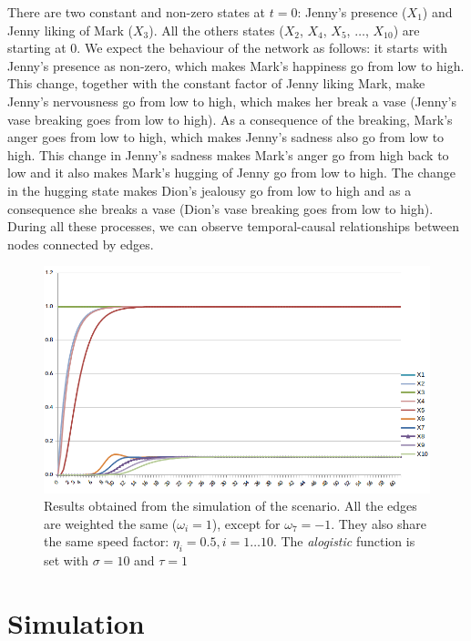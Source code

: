\documentclass[a4paper]{article}
\begin{document}
There are two constant and non-zero states at $t = 0$: Jenny's presence ($X_{1}$) and Jenny liking of Mark ($X_{3}$). All the others states ($X_{2}$, $X_{4}$, $X_{5}$, $\ldots$, $X_{10}$) are starting at $0$. We expect the behaviour of the network as follows: it starts with Jenny's presence as non-zero, which makes Mark's happiness go from low to high. This change, together with the constant factor of Jenny liking Mark, make Jenny's nervousness go from low to high, which makes her break a vase (Jenny's vase breaking goes from low to high). As a consequence of the breaking, Mark's anger goes from low to high, which makes Jenny's sadness also go from low to high. This change in Jenny's sadness makes Mark's anger go from high back to low and it also makes Mark's hugging of Jenny go from low to high. The change in the hugging state makes Dion's jealousy go from low to high and as a consequence she breaks a vase (Dion's vase breaking goes from low to high). During all these processes, we can observe temporal-causal relationships between nodes connected by edges.

\begin{figure}[!ht]
\center
\includegraphics[width=\textwidth]{res/img/numerical_representation}
\caption{Results obtained from the simulation of the scenario. All the edges are weighted the same ($\omega_{i} = 1$), except for $\omega_{7} = -1$. They also share the same speed factor: $\eta_{i} = 0.5,  i = 1 \ldots 10$. The \textit{alogistic} function is set with $\sigma = 10$ and $\tau = 1$}
\label{fig:numerical_representation}
\end{figure}

\section{Simulation}
\end{document}
